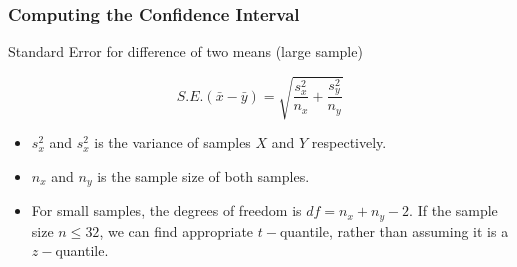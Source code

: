 \begin{frame}
\frametitle{Computing the Confidence Interval}
Standard Error for difference of two means (large sample)

\[ S.E.(\bar{x}-\bar{y}) = \sqrt{\frac{s^2_x}{n_x} + \frac{s^2_y}{n_y}} \]

\begin{itemize}
\item $s^2_x$ and $s^2_x$ is the variance of samples $X$ and $Y$ respectively.
\item $n_x$ and $n_y$ is the sample size of both samples.\bigskip

\item For small samples, the degrees of freedom is $df = n_x + n_y - 2$. If the sample size $n \leq 32$, we can find appropriate $t-$quantile, rather than assuming it is a $z-$quantile.
\end{itemize}
\end{frame}